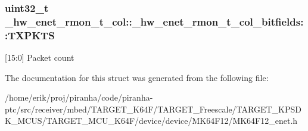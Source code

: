 \subsubsection[{\texorpdfstring{T\+X\+P\+K\+TS}{TXPKTS}}]{\setlength{\rightskip}{0pt plus 5cm}uint32\+\_\+t \+\_\+hw\+\_\+enet\+\_\+rmon\+\_\+t\+\_\+col\+::\+\_\+hw\+\_\+enet\+\_\+rmon\+\_\+t\+\_\+col\+\_\+bitfields\+::\+T\+X\+P\+K\+TS}\hypertarget{struct__hw__enet__rmon__t__col_1_1__hw__enet__rmon__t__col__bitfields_a14e0cda37477b6b4c2db5b4b66f10006}{}\label{struct__hw__enet__rmon__t__col_1_1__hw__enet__rmon__t__col__bitfields_a14e0cda37477b6b4c2db5b4b66f10006}
\mbox{[}15\+:0\mbox{]} Packet count 

The documentation for this struct was generated from the following file\+:\begin{DoxyCompactItemize}
\item 
/home/erik/proj/piranha/code/piranha-\/ptc/src/receiver/mbed/\+T\+A\+R\+G\+E\+T\+\_\+\+K64\+F/\+T\+A\+R\+G\+E\+T\+\_\+\+Freescale/\+T\+A\+R\+G\+E\+T\+\_\+\+K\+P\+S\+D\+K\+\_\+\+M\+C\+U\+S/\+T\+A\+R\+G\+E\+T\+\_\+\+M\+C\+U\+\_\+\+K64\+F/device/device/\+M\+K64\+F12/M\+K64\+F12\+\_\+enet.\+h\end{DoxyCompactItemize}
